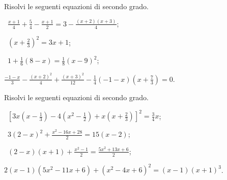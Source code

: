 \begin{esercizio}[\Ast]
\label{ese:3.29} %
Risolvi le seguenti equazioni di secondo grado.
 \begin{enumeratea}
 \item~$\frac{x+1}{4} + \frac{5}{4}-\frac{x+1}{2} = 3-\frac{(x+2)(x+3)}{4}$;
 \item~$\left(x + \frac{2}{3} \right)^{2}= 3x+1$;
 \item~$1+\frac{1}{6}(8-x)=\frac{1}{8}(x-9)^{2}$;
 \item $\frac{-1-x}{3}-\frac{(x+2)^{2}}{4}+\frac{(x+3)^{2}}{12}-\frac{1}{4}(-1-x)\left(x+\frac{7}{3}\right)=0$.
 \end{enumeratea}
\end{esercizio}

\begin{esercizio}[\Ast]
\label{ese:3.30} %
Risolvi le seguenti equazioni di secondo grado.
 \begin{enumeratea}
 \item~$\left[3x\left(x-\frac{1}{3}\right)-4\left(x^{2}-\frac{1}{2}\right)+x\left(x+\frac{2}{3}\right)\right]^{2} = \frac{3}{4}x$;
 \item~$3(2-x)^{2}+ \frac{x^{2}-16x+28}{2}= 15(x-2)$;
 \item~$(2-x)(x+1)+\frac{x^{2}-1}{2}=\frac{5x^{2}+13x+6}{2}$;
 \item $2(x-1)\left(5x^{2}-11x+6\right)+\left(x^{2}-4x+6\right)^{2}=(x-1)(x+1)^{3}$.
 \end{enumeratea}
\end{esercizio}

